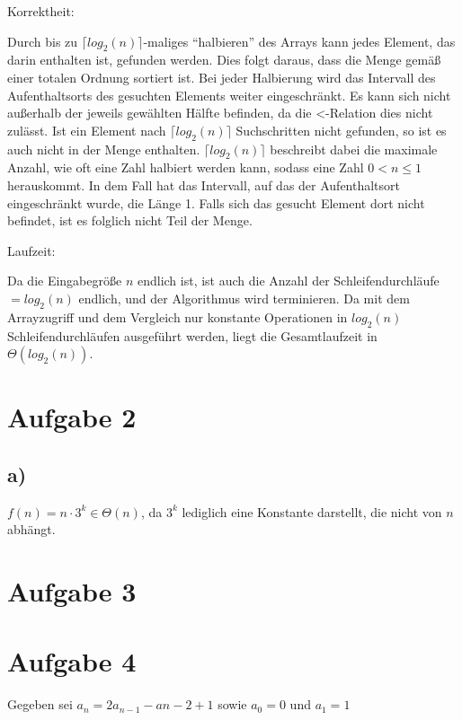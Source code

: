\documentclass[a4paper,10pt,freqn]{article}
\begin{document}
\begin{bfseries}Korrektheit:\end{bfseries}\newline
Durch bis zu $\lceil log_{2}(n)\rceil$-maliges ``halbieren'' des Arrays kann jedes Element, das darin enthalten ist,
gefunden werden. Dies folgt daraus, dass die Menge gemäß einer totalen Ordnung sortiert ist. Bei jeder Halbierung wird
das Intervall des Aufenthaltsorts des gesuchten Elements weiter eingeschränkt. Es kann sich nicht außerhalb der
jeweils gewählten Hälfte befinden, da die <-Relation dies nicht zulässt. Ist ein Element nach $\lceil log_{2}(n)\rceil$
Suchschritten nicht gefunden, so ist es auch nicht in der Menge enthalten. $\lceil log_{2}(n)\rceil$ beschreibt dabei
die maximale Anzahl, wie oft eine Zahl halbiert werden kann, sodass eine Zahl $0<n\leq1$ herauskommt. In dem Fall hat
das Intervall, auf das der Aufenthaltsort eingeschränkt wurde, die Länge 1. Falls sich das gesucht Element dort nicht
befindet, ist es folglich nicht Teil der Menge.

\begin{bfseries}Laufzeit:\end{bfseries}\newline
Da die Eingabegröße $n$ endlich ist, ist auch die Anzahl der Schleifendurchläufe $= log_{2}(n)$ endlich,
und der Algorithmus wird terminieren. Da mit dem Arrayzugriff und dem Vergleich nur konstante Operationen
in $log_{2}(n)$ Schleifendurchläufen ausgeführt werden, liegt die Gesamtlaufzeit in $\Theta(log_{2}(n))$.

\section{Aufgabe 2}
\subsection{a)}
$f(n)=n\cdot3^{k} \in \Theta(n)$, da $3^k$ lediglich eine Konstante darstellt, die nicht von $n$ abhängt.

\section{Aufgabe 3}

\section{Aufgabe 4}
Gegeben sei $a_n = 2a_{n-1}-a{n-2} + 1$
sowie $a_0 = 0$ und $a_1 = 1$\\
\end{document}
